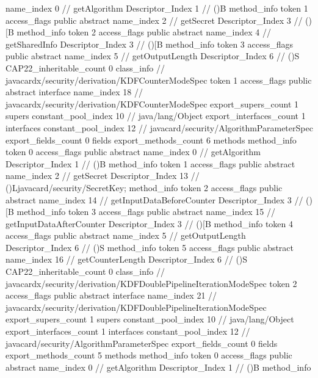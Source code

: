 {{{{{					name_index	0		// getAlgorithm
					Descriptor_Index	1		// ()B
				}
				method_info {
					token	1
					access_flags	public abstract
					name_index	2		// getSecret
					Descriptor_Index	3		// ()[B
				}
				method_info {
					token	2
					access_flags	public abstract
					name_index	4		// getSharedInfo
					Descriptor_Index	3		// ()[B
				}
				method_info {
					token	3
					access_flags	public abstract
					name_index	5		// getOutputLength
					Descriptor_Index	6		// ()S
				}
			}
			CAP22_inheritable_count	0
		}
		class_info {		// javacardx/security/derivation/KDFCounterModeSpec
			token	1
			access_flags	public abstract interface
			name_index	18		// javacardx/security/derivation/KDFCounterModeSpec
			export_supers_count	1
			supers {
				constant_pool_index	10		// java/lang/Object
			}
			export_interfaces_count	1
			interfaces {
				constant_pool_index	12		// javacard/security/AlgorithmParameterSpec
			}
			export_fields_count	0
			fields {
			}
			export_methods_count	6
			methods {
				method_info {
					token	0
					access_flags	public abstract
					name_index	0		// getAlgorithm
					Descriptor_Index	1		// ()B
				}
				method_info {
					token	1
					access_flags	public abstract
					name_index	2		// getSecret
					Descriptor_Index	13		// ()Ljavacard/security/SecretKey;
				}
				method_info {
					token	2
					access_flags	public abstract
					name_index	14		// getInputDataBeforeCounter
					Descriptor_Index	3		// ()[B
				}
				method_info {
					token	3
					access_flags	public abstract
					name_index	15		// getInputDataAfterCounter
					Descriptor_Index	3		// ()[B
				}
				method_info {
					token	4
					access_flags	public abstract
					name_index	5		// getOutputLength
					Descriptor_Index	6		// ()S
				}
				method_info {
					token	5
					access_flags	public abstract
					name_index	16		// getCounterLength
					Descriptor_Index	6		// ()S
				}
			}
			CAP22_inheritable_count	0
		}
		class_info {		// javacardx/security/derivation/KDFDoublePipelineIterationModeSpec
			token	2
			access_flags	public abstract interface
			name_index	21		// javacardx/security/derivation/KDFDoublePipelineIterationModeSpec
			export_supers_count	1
			supers {
				constant_pool_index	10		// java/lang/Object
			}
			export_interfaces_count	1
			interfaces {
				constant_pool_index	12		// javacard/security/AlgorithmParameterSpec
			}
			export_fields_count	0
			fields {
			}
			export_methods_count	5
			methods {
				method_info {
					token	0
					access_flags	public abstract
					name_index	0		// getAlgorithm
					Descriptor_Index	1		// ()B
				}
				method_info {
}}}}}
